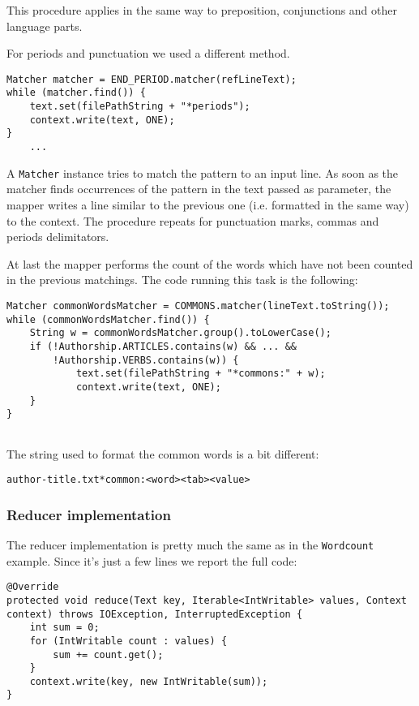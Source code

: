 \documentclass[a4paper,11pt, twoside]{article}
\begin{document}
	This procedure applies in the same way to preposition, conjunctions and other language parts.
	
	\bigskip
	\noindent
	For periods and punctuation we used a different method.
	\begin{lstlisting}[firstnumber=109, caption={Periods counting in Map method}, captionpos=b]
Matcher matcher = END_PERIOD.matcher(refLineText);
while (matcher.find()) {
	text.set(filePathString + "*periods");
	context.write(text, ONE);
}
	...
	\end{lstlisting}
	
	\noindent
	A \lstinline|Matcher| instance tries to match the pattern to an input line. As soon as the matcher finds occurrences of the pattern in the text passed as parameter, the mapper writes a line similar to the previous one (i.e. formatted in the same way) to the context. The procedure repeats for punctuation marks, commas and periods delimitators. 
	
	\noindent
	At last the mapper performs the count of the words which have not been counted in the previous matchings. The code running this task is the following:
	\begin{lstlisting}[firstnumber=119, caption={Common words counting in the Map method.}, captionpos=b]
Matcher commonWordsMatcher = COMMONS.matcher(lineText.toString());
while (commonWordsMatcher.find()) {
	String w = commonWordsMatcher.group().toLowerCase();
	if (!Authorship.ARTICLES.contains(w) && ... &&
		!Authorship.VERBS.contains(w)) {
			text.set(filePathString + "*commons:" + w);
			context.write(text, ONE);
	}
}
		
	\end{lstlisting}
	
	\noindent
	The string used to format the common words is a bit different: 
	\begin{center}
		\texttt{author-title.txt*common:<word><tab><value>}
	\end{center}
	
	\subsubsection{Reducer implementation}
		The reducer implementation is pretty much the same as in the \lstinline|Wordcount| example. Since it's just a few lines we report the full code:
	\begin{lstlisting}[firstnumber=152, caption={Reduce method}, captionpos=b]
@Override
protected void reduce(Text key, Iterable<IntWritable> values, Context context) throws IOException, InterruptedException {
	int sum = 0;
	for (IntWritable count : values) {
		sum += count.get();
	}
	context.write(key, new IntWritable(sum));
}
	\end{lstlisting}
	
\end{document}
